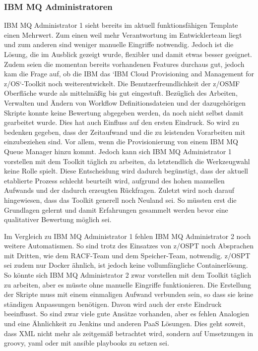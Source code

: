 \subsubsection{IBM MQ Administratoren}
IBM MQ Administrator 1 sieht bereits im aktuell funktionsfähigen Template einen Mehrwert.
Zum einen weil mehr Verantwortung im Entwicklerteam liegt und zum anderen sind weniger manuelle Eingriffe notwendig.
Jedoch ist die Lösung, die im Ausblick gezeigt wurde, flexibler und damit etwas besser geeignet.
Zudem seien die momentan bereits vorhandenen Features durchaus gut, jedoch kam die Frage auf, ob die IBM das `IBM Cloud Provisioning and Management for z/OS`-Toolkit noch weiterentwickelt.
Die Benutzerfreundlichkeit der z/OSMF Oberfläche wurde als mittelmäßig bis gut eingestuft.
Bezüglich des Arbeiten, Verwalten und Ändern von Workflow Definitionsdateien und der dazugehörigen Skripte konnte keine Bewertung abgegeben werden, da noch nicht selbst damit gearbeitet wurde.
Dies hat auch Einfluss auf den ersten Eindruck.
So wird zu bedenken gegeben, dass der Zeitaufwand und die zu leistenden Vorarbeiten mit einzubeziehen sind.
Vor allem, wenn die Provisionierung von einem IBM MQ Queue Manager hinzu kommt.
Jedoch kann sich IBM MQ Administrator 1 vorstellen mit dem Toolkit täglich zu arbeiten, da letztendlich die Werkzeugwahl keine Rolle spielt.
Diese Entscheidung wird dadurch begünstigt, dass der aktuell etablierte Prozess schlecht beurteilt wird, aufgrund des hohen manuellen Aufwands und der dadurch erzeugten Rückfragen.
Zuletzt wird noch darauf hingewiesen, dass das Toolkit generell noch Neuland sei.
So müssten erst die Grundlagen gelernt und damit Erfahrungen gesammelt werden bevor eine qualitativer Bewertung möglich sei.

Im Vergleich zu IBM MQ Administrator 1 fehlen IBM MQ Administrator 2 noch weitere Automatismen.
So sind trotz des Einsatzes von z/OSPT noch Absprachen mit Dritten, wie dem RACF-Team und dem Speicher-Team, notwendig.
z/OSPT sei zudem nur Docker ähnlich, ist jedoch keine vollumfängliche Containerlösung.
So könnte sich IBM MQ Administrator 2 zwar vorstellen mit dem Toolkit täglich zu arbeiten, aber es müsste ohne manuelle Eingriffe funktionieren.
Die Erstellung der Skripte muss mit einem einmaligen Aufwand verbunden sein, so dass sie keine ständigen Anpassungen benötigen.
Davon wird auch der erste Eindruck beeinflusst.
So sind zwar viele gute Ansätze vorhanden, aber es fehlen Analogien und eine Ähnlichkeit zu Jenkins und anderen PaaS Lösungen.
Dies geht soweit, dass XML nicht mehr als zeitgemäß betrachtet wird, sondern auf Umsetzungen in groovy, yaml oder mit ansible playbooks zu setzen sei.

